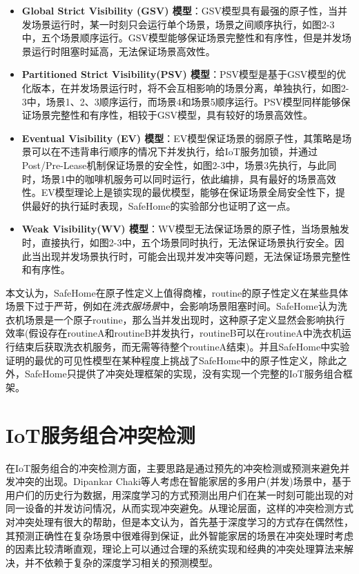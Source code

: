 \documentclass[winfonts,master,twoside]{njuthesis}
\begin{document}
\begin{itemize}
    \item \textbf{Global Strict Visibility (GSV) 模型}：GSV模型具有最强的原子性，当并发场景运行时，某一时刻只会运行单个场景，场景之间顺序执行，如图2-3中，五个场景顺序运行。GSV模型能够保证场景完整性和有序性，但是并发场景运行时阻塞时延高，无法保证场景高效性。
   \item \textbf{Partitioned Strict Visibility(PSV) 模型}：PSV模型是基于GSV模型的优化版本，在并发场景运行时，将不会互相影响的场景分离，单独执行，如图2-3中，场景1、2、3顺序运行，而场景4和场景5顺序运行。PSV模型同样能够保证场景完整性和有序性，相较于GSV模型，具有较好的场景高效性。
    \item \textbf{Eventual Visibility (EV) 模型}：EV模型保证场景的弱原子性，其策略是场景可以在不违背串行顺序的情况下并发执行，给IoT服务加锁，并通过Post/Pre-Lease机制保证场景的安全性，如图2-3中，场景3先执行，与此同时，场景1中的咖啡机服务可以同时运行，依此编排，具有最好的场景高效性。EV模型理论上是锁实现的最优模型，能够在保证场景全局安全性下，提供最好的执行延时表现，SafeHome的实验部分也证明了这一点。
    \item \textbf{Weak Visibility(WV) 模型}：WV模型无法保证场景的原子性，当场景触发时，直接执行，如图2-3中，五个场景同时执行，无法保证场景执行安全。因此当出现并发场景执行时，可能会出现并发冲突等问题，无法保证场景完整性和有序性。
\end{itemize}

本文认为，SafeHome在原子性定义上值得商榷，routine的原子性定义在某些具体场景下过于严苛，例如在\textit{洗衣服场景}中，会影响场景阻塞时间。SafeHome认为洗衣机场景是一个原子routine，那么当并发出现时，这种原子定义显然会影响执行效率(假设存在routineA和routineB并发执行，routineB可以在routineA中洗衣机运行结束后获取洗衣机服务，而无需等待整个routineA结束)。并且SafeHome中实验证明的最优的可见性模型在某种程度上挑战了SafeHome中的原子性定义，除此之外，SafeHome只提供了冲突处理框架的实现，没有实现一个完整的IoT服务组合框架。



\section{IoT服务组合冲突检测}

在IoT服务组合的冲突检测方面，主要思路是通过预先的冲突检测或预测来避免并发冲突的出现。Dipankar Chaki等人\cite{chaki2020conflict}\cite{chaki2020fine}\cite{huang2018convenience}考虑在智能家居的多用户(并发)场景中，基于用户们的历史行为数据，用深度学习的方式预测出用户们在某一时刻可能出现的对同一设备的并发访问情况，从而实现冲突避免。从理论层面，这样的冲突检测方式对冲突处理有很大的帮助，但是本文认为，首先基于深度学习的方式存在偶然性，其预测正确性在复杂场景中很难得到保证，此外智能家居的场景在冲突处理时考虑的因素比较清晰直观，理论上可以通过合理的系统实现和经典的冲突处理算法来解决，并不依赖于复杂的深度学习相关的预测模型。
\end{document}
